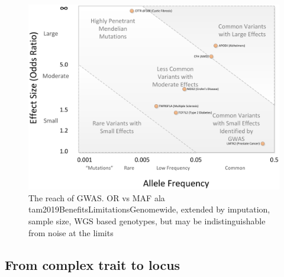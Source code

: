 \begin{outline}
%
%
\begin{figure}
    \centering
    \includegraphics[width=1.0\textwidth,page=1]{mainmatter/figures/chapter_01/journal.pcbi.1002822.g001.png}
    \caption{The reach of GWAS. OR vs MAF ala tam2019BenefitsLimitationsGenomewide, extended by imputation, sample size, WGS based genotypes, but may be indistinguishable from noise at the limits}
    \label{fig:intro_architectureGWAS}
\end{figure}

\subsection{From complex trait to locus}


\end{outline}
